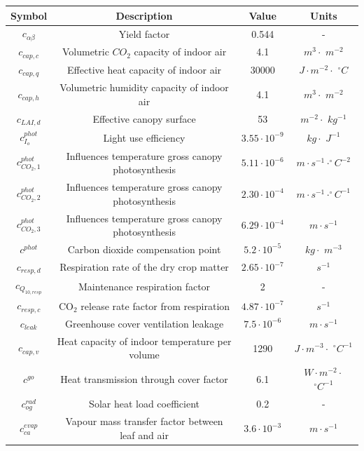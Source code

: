 \begin{table}[H]
	\centering
	\begin{tabular}{|c|c|c|c|}
		\hline
		\textbf{Symbol} & \textbf{Description} & \textbf{Value} & \textbf{Units} \\ \hline
		$c_{\alpha \beta}$ & Yield factor & 0.544 & - \\ 
		$c_{cap,c}$ & Volumetric $CO_2$ capacity of indoor air & 4.1 & $m^3\cdot$ $m^{-2}$ \\ 
		$c_{cap,q}$ & Effective heat capacity of indoor air & 30000 & $J \cdot m^{-2}\cdot$ $^{\circ}C$ \\ 
		$c_{cap,h}$ & Volumetric humidity capacity of indoor air & 4.1 & $m^3\cdot$ $m^{-2}$\\ 
		$c_{LAI,d}$ & Effective canopy surface & 53 & $m^{-2} \cdot$ $kg^{-1}$  \\ 
		$c_{I_o}^{phot}$ & Light use efficiency & $3.55 \cdot 10^{-9}$ & $kg \cdot$ $J^{-1}$ \\ 
		$c_{CO_2,1}^{phot}$ & Influences temperature gross canopy photosynthesis & $5.11 \cdot 10^{-6}$ & $m \cdot s^{-1} \cdot ^{\circ}C^{-2}$ \\ 
		$c_{CO_2,2}^{phot}$ & Influences temperature gross canopy photosynthesis & $2.30 \cdot 10^{-4}$ & $m \cdot s^{-1} \cdot ^{\circ}C^{-1}$ \\ 
		$c_{CO_2,3}^{phot}$ & Influences temperature gross canopy photosynthesis & $6.29 \cdot 10^{-4}$ & $m \cdot s^{-1}$ \\ 
		$c^{phot}$ & Carbon dioxide compensation point & $5.2 \cdot 10^{-5}$ & $kg \cdot$ $m^{-3}$\\ 
		$c_{resp,d}$ & Respiration rate of the dry crop matter & $2.65 \cdot 10^{-7}$ & $s^{-1}$ \\ 
		$c_{Q_{10,resp}}$ & Maintenance respiration factor & 2 & - \\ 
		$c_{resp,c}$ & CO$_2$ release rate factor from respiration & $4.87 \cdot 10^{-7}$ & $s^{-1}$ \\ 
		$c_{leak}$ & Greenhouse cover ventilation leakage & $7.5 \cdot 10^{-6}$ & $m \cdot s^{-1}$ \\ 
		$c_{cap,v}$ & Heat capacity of indoor temperature per volume & 1290 & $J \cdot m^{-3} \cdot$ $^{\circ}C^{-1}$ \\ 
		$c^{go}$ & Heat transmission through cover factor & 6.1 & $W \cdot m^{-2} \cdot$ $^{\circ}C^{-1}$ \\ 
		$c_{og}^{rad}$ & Solar heat load coefficient & 0.2 & - \\ 
		$c_{ca}^{evap}$ & Vapour mass transfer factor between leaf and air & $3.6 \cdot 10^{-3}$ & $m \cdot s^{-1}$ \\ 

\end{tabular}
\end{table}
